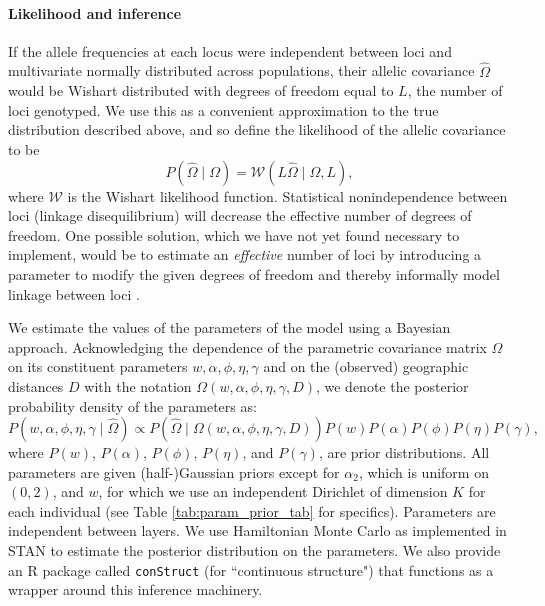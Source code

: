 \documentclass[12pt]{article}
\begin{document}
\paragraph{Likelihood and inference}
If the allele frequencies at each locus
were independent between loci and multivariate normally distributed across populations, 
their allelic covariance $\widehat{\Omega}$ 
would be Wishart distributed with degrees of freedom equal to $L$, 
the number of loci genotyped.
We use this as a convenient approximation to the true distribution described above,
and so define the likelihood of the allelic covariance to be
\begin{equation}
    P(\widehat{\Omega} \; | \; \Omega) 
    = 
    \mathcal{W} \left( L\widehat{\Omega} \; | \; \Omega,L\right) ,
\end{equation}
where $\mathcal{W}$ is the Wishart likelihood function.
Statistical nonindependence between loci (linkage disequilibrium)
will decrease the effective
number of degrees of freedom.  
One possible solution, which we have not yet found necessary to implement,
would be to estimate an \emph{effective} number of loci 
by introducing a parameter to modify the given degrees of freedom 
and thereby informally model linkage between loci \citep[e.g.][]{EEMS}.

We estimate the values of the parameters of the model using a Bayesian approach.
Acknowledging the dependence of the parametric covariance matrix $\Omega$ on its constituent parameters
$w,\alpha,\phi,\eta,\gamma$ and on the (observed) geographic distances $D$ 
with the notation $\Omega(w,\alpha,\phi,\eta,\gamma,D)$,
we denote the posterior probability density of the parameters as:
\begin{equation}
P\left( w,\alpha,\phi,\eta,\gamma \;|\; \widehat{\Omega} \right) 
    \propto
    P\left(\widehat{\Omega} \; | \; \Omega(w,\alpha,\phi,\eta,\gamma,D) \right)
    P(w)P(\alpha)P(\phi)P(\eta)P(\gamma) ,
\end{equation}
where $P(w)$, $P(\alpha)$, $P(\phi)$, $P(\eta)$, and $P(\gamma)$, are prior distributions.
All parameters are given (half-)Gaussian priors 
except for $\alpha_2$, which is uniform on $(0,2)$, 
and $w$, for which we use an independent Dirichlet of dimension $K$ for each individual
(see Table \ref{tab:param_prior_tab} for specifics).
Parameters are independent between layers.
We use Hamiltonian Monte Carlo as implemented in STAN \citep{stan, NUTS, stan_lib, rstan} 
to estimate the posterior distribution on the parameters.
We also provide an R package \citep{R} called \texttt{conStruct} 
(for ``continuous structure") that functions as a wrapper around this inference machinery.
\end{document}
